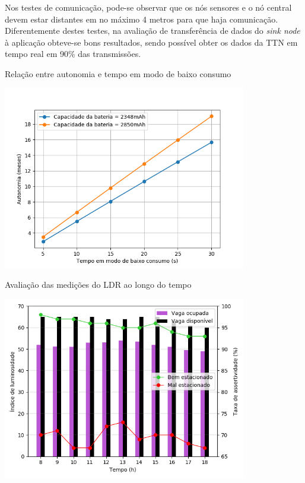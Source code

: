 \documentclass[oneside,openright,12pt]{ufsm_2015} %
\begin{document}
Nos testes de comunicação, pode-se observar que os nós sensores e o nó central devem estar distantes em no máximo 4 metros para que haja comunicação. Diferentemente destes testes, na avaliação de transferência de dados do \textit{sink node} à aplicação obteve-se bons resultados, sendo possível obter os dados da TTN em tempo real em 90\% das transmissões.

\begin{grafico}[ht]
     	    \caption{\label{exepretex} Relação entre autonomia e tempo em modo de baixo consumo}
            \centering
            \includegraphics[width=0.8\textwidth]{figuras/autonomias_plot.png}
            \vspace{\baselineskip} %
            \label{graph:autonomias}
    \end{grafico}

\begin{grafico}[H]
     	    \caption{\label{exepretex} Avaliação das medições do LDR ao longo do tempo}
            \centering
            \includegraphics[width=0.8\textwidth]{figuras/ldr_evaluation.png}
            \vspace{\baselineskip} %
            \label{graph:ldr-aval}
    \end{grafico}
\end{document}
